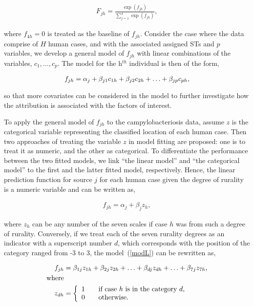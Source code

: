 \documentclass[times, doublespace]{WileyNJD-v2}%
\begin{document}
\begin{align}
  F_{jh}  = \frac{\exp (f_{jh})}{\sum_{j=1}^4 \exp(f_{jh})},
  \label{capF}
\end{align}

where $f_{4h}=0$ is treated as the baseline of $f_{jh}$. Consider the case where the data comprise of $H$ human cases, and with the associated assigned STs and $p$ variables, we develop a general model of $f_{jh}$ with linear combinations of the variables, $c_1, \ldots, c_p$. The model for the h$^{th}$ individual is then of the form,

\begin{align}
f_{jh}  = \alpha_{j} + \beta_{j1} c_{1h} + \beta_{j2} c_{2h} + \ldots + \beta_{jp} c_{ph},  \notag   
\end{align}

so that more covariates can be considered in the model to further investigate how the attribution is associated with the factors of interest.

To apply the general model of $f_{jh}$ to the campylobacteriosis data, assume $z$ is the categorical variable representing the classified location of each human case. Then two approaches of treating the variable $z$ in model fitting are proposed: one is to treat it as numeric, and the other as categorical. To differentiate the performance between the two fitted models, we link ``the linear model'' and ``the categorical model'' to the first and the latter fitted model, respectively. Hence, the linear prediction function for source $j$ for each human case given the degree of rurality is a numeric variable and can be written as,

\begin{align}
  f_{jh} = \alpha_{j} + \beta_{j} z_{h},
  \label{modL}
\end{align}

where $z_{h}$ can be any number of the seven scales if case $h$ was from such a degree of rurality. Conversely, if we treat each of the seven rurality degrees as an indicator with a superscript number $d$, which corresponds with the position of the category ranged from -3 to 3, the model~(\ref{modL}) can be rewritten as,

\begin{align}
  f_{jh} & = \beta_{1j} z_{1h}+ \beta_{2j} z_{2h} + \ldots + \beta_{dj} z_{dh} + \ldots +  \beta_{7j} z_{7h}, \\
  \text{where} & \notag\\
z_{dh} & =
\left\{\begin{array}{rcl}
1 && \mbox{if case $h$ is in the category $d$,} \notag \\ 0 && \mbox{otherwise}. 
\end{array}\right.
  \label{modC}
\end{align}
\end{document}
